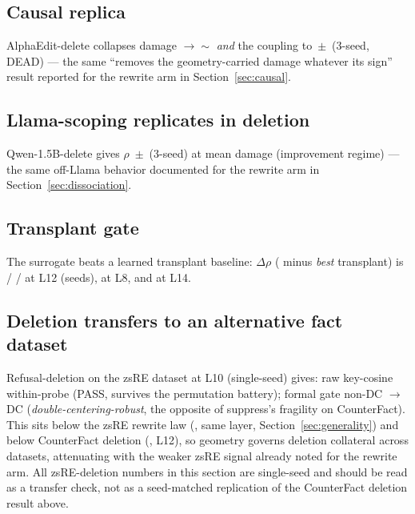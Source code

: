 \subsection{Causal replica}
AlphaEdit-delete collapses damage \alphaDelDmgPre{}$\rightarrow\sim$\alphaDelDmgPost{}
\emph{and} the coupling to \alphaDelRho{}\,$\pm$\,\alphaDelRhoSD{} (3-seed,
DEAD) --- the same ``removes the geometry-carried damage whatever its
sign'' result reported for the rewrite arm in Section~\ref{sec:causal}.

\subsection{Llama-scoping replicates in deletion}
Qwen-1.5B-delete gives $\rho$ \qwenDelRho{}\,$\pm$\,\qwenDelRhoSD{} (3-seed)
at mean damage \qwenDelDmg{} (improvement regime) --- the same off-Llama
behavior documented for the rewrite arm in Section~\ref{sec:dissociation}.

\subsection{Transplant gate}
The \SxC{} surrogate beats a learned transplant baseline: $\Delta\rho$
(\SxC{} minus \emph{best} transplant) is \transDeltaLtwelveA{} /
\transDeltaLtwelveB{} / \transDeltaLtwelveC{} at L12 (seeds),
\transDeltaLeight{} at L8, and \transDeltaLfourteen{} at L14.

\subsection{Deletion transfers to an alternative fact dataset}
Refusal-deletion on the zsRE dataset \citep{levy2017zsre} at L10
(single-seed) gives: raw key-cosine within-probe \zsreDelRaw{} (PASS,
survives the permutation battery); formal gate \SxC{} non-DC \zsreDelNonDC{}
$\rightarrow$ DC \zsreDelDC{} (\emph{double-centering-robust}, the opposite
of suppress's fragility on CounterFact). This sits below the zsRE rewrite
law (\zsreRewrite{}, same layer, Section~\ref{sec:generality}) and below
CounterFact deletion (\delRefNonDCa{}, L12), so geometry governs deletion
collateral across datasets, attenuating with the weaker zsRE signal already
noted for the rewrite arm. All zsRE-deletion numbers in this section are
single-seed and should be read as a transfer check, not as a
seed-matched replication of the CounterFact deletion result above.
